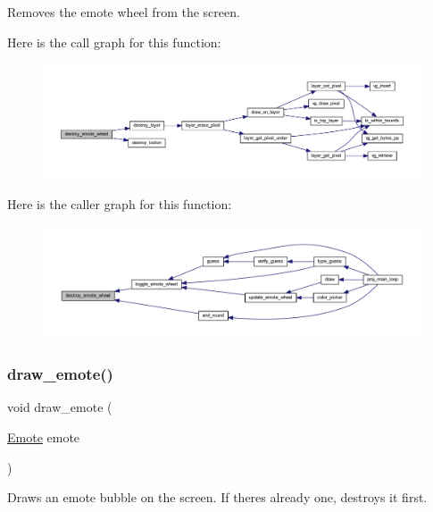 Removes the emote wheel from the screen. 

Here is the call graph for this function\+:\nopagebreak
\begin{figure}[H]
\begin{center}
\leavevmode
\includegraphics[width=350pt]{group__emote_ga96db30bf99d18ac5410e84902ac4004b_cgraph}
\end{center}
\end{figure}
Here is the caller graph for this function\+:\nopagebreak
\begin{figure}[H]
\begin{center}
\leavevmode
\includegraphics[width=350pt]{group__emote_ga96db30bf99d18ac5410e84902ac4004b_icgraph}
\end{center}
\end{figure}
\mbox{\label{group__emote_gaf6942466a79762f72a66284fc1d13ad3}} 
\subsubsection{\texorpdfstring{draw\+\_\+emote()}{draw\_emote()}}
{\footnotesize\ttfamily void draw\+\_\+emote (\begin{DoxyParamCaption}\item[{\mbox{\hyperlink{group__emote_ga0e527855c554e31654c9beb340145574}{Emote}}}]{emote }\end{DoxyParamCaption})}



Draws an emote bubble on the screen. If there\textquotesingle{}s already one, destroys it first. 


